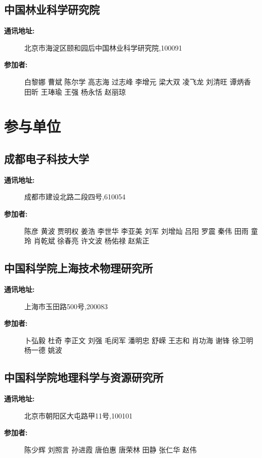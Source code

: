 \documentclass[letterpaper,10pt,english]{sphinxmanual}
\begin{document}
\subsection{中国林业科学研究院}
\label{water_partner:id6}\begin{description}
\item[{\textbf{通讯地址:}}] \leavevmode
北京市海淀区颐和园后中国林业科学研究院,100091

\item[{\textbf{参加者:}}] \leavevmode
白黎娜
曹斌
陈尔学
高志海
过志峰
李增元
梁大双
凌飞龙
刘清旺
谭炳香
田昕
王琫瑜
王强
杨永恬
赵丽琼

\end{description}


\section{参与单位}
\label{water_partner:id7}

\subsection{成都电子科技大学}
\label{water_partner:id8}\begin{description}
\item[{\textbf{通讯地址:}}] \leavevmode
成都市建设北路二段四号,610054

\item[{\textbf{参加者:}}] \leavevmode
陈彦
黄波
贾明权
姜浩
李世华
李亚美
刘军
刘增灿
吕阳
罗震
秦伟
田雨
童玲
肖乾斌
徐春亮
许文波
杨佑禄
赵紫正

\end{description}


\subsection{中国科学院上海技术物理研究所}
\label{water_partner:id9}\begin{description}
\item[{\textbf{通讯地址:}}] \leavevmode
上海市玉田路500号,200083

\item[{\textbf{参加者:}}] \leavevmode
卜弘毅
杜奇
李正文
刘强
毛闵军
潘明忠
舒嵘
王志和
肖功海
谢锋
徐卫明
杨一德
姚波

\end{description}


\subsection{中国科学院地理科学与资源研究所}
\label{water_partner:id10}\begin{description}
\item[{\textbf{通讯地址:}}] \leavevmode
北京市朝阳区大屯路甲11号,100101

\item[{\textbf{参加者:}}] \leavevmode
陈少辉
刘照言
孙进霞
唐伯惠
唐荣林
田静
张仁华
赵伟

\end{description}
\end{document}
